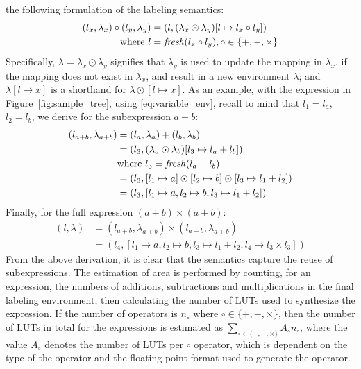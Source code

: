 the following formulation of the labeling semantics:
\begin{equation}
    \begin{aligned}
        (l_x, \lambda_x) \circ (l_y, \lambda_y)
            &= (l, (\lambda_x\odot\lambda_y)
                      [l\mapsto{l_x \circ l_y}]) \\
            \text{where~} l &= \operatorname{\mathit{fresh}}(l_x \circ l_y),
                          \circ\in\{+, -, \times\}
    \end{aligned}
    \label{eq:labeling_semantics}
\end{equation}
Specifically, $\lambda=\lambda_x\odot\lambda_y$ signifies that $\lambda_y$
is used to update the mapping in $\lambda_x$, if the mapping does not
exist in $\lambda_x$, and result in a new environment $\lambda$; and
$\lambda[l\mapsto{x}]$ is a shorthand for $\lambda\odot[l\mapsto{x}]$.
As an example, with the expression in Figure~\ref{fig:sample_tree}, using
\eqref{eq:variable_env}, recall to mind that $l_1 = l_a$, $l_2 = l_b$, we
derive for the subexpression $a + b$:
\begin{equation}
    \begin{aligned}
        (l_{a + b}, \lambda_{a + b})
            &= (l_a, \lambda_a) + (l_b, \lambda_b) \\
            &= (l_3, (\lambda_a \odot \lambda_b) [l_3\mapsto{l_a + l_b}]) \\
            &  \text{where~} l_3 = \operatorname{\mathit{fresh}}(l_a + l_b) \\
            &= (l_3, [l_1\mapsto{a}]\odot
                     [l_2\mapsto{b}]\odot
                     [l_3\mapsto{l_1 + l_2}]) \\
            &= (l_3, [l_1\mapsto{a}, l_2\mapsto{b}, l_3\mapsto{l_1 + l_2}])
    \end{aligned}
\end{equation}
Finally, for the full expression $(a + b) \times (a + b)$:
\begin{equation}
    \begin{aligned}
        (l, \lambda)
            &= (l_{a + b}, \lambda_{a + b}) \times
               (l_{a + b}, \lambda_{a + b}) \\
            &= (l_4, [l_1\mapsto{a}, l_2\mapsto{b},
                      l_3\mapsto{l_1 + l_2}, l_4\mapsto{l_3 \times l_3}])
    \end{aligned}
\end{equation}
From the above derivation, it is clear that the semantics capture the reuse
of subexpressions. The estimation of area is performed by counting, for an
expression, the numbers of additions, subtractions and multiplications in
the final labeling environment, then calculating the number of LUTs used to
synthesize the expression. If the number of operators is $n_\circ$ where
$\circ\in\{+,-,\times\}$, then the number of LUTs in total for the expressions
is estimated as $\sum_{\circ\in\{+,-,\times\}} A_\circ n_\circ$, where the
value $A_\circ$ denotes the number of LUTs per $\circ$ operator, which is
dependent on the type of the operator and the floating-point format used to
generate the operator.

